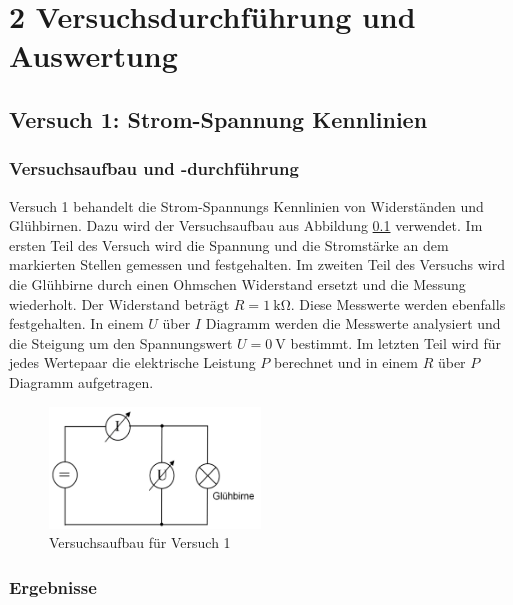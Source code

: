 \chapter*{2 Versuchsdurchführung und Auswertung}
\setcounter{chapter}{2}
\setcounter{section}{0}
\setcounter{subsection}{0}

\section{Versuch 1: Strom-Spannung Kennlinien}

    \subsection{Versuchsaufbau und -durchführung}

        Versuch 1 behandelt die Strom-Spannungs Kennlinien von Widerständen und Glühbirnen. Dazu wird der Versuchsaufbau aus Abbildung \ref{fig:versuch1} verwendet. Im ersten Teil des Versuch wird die Spannung und die Stromstärke an dem markierten Stellen gemessen und festgehalten. Im zweiten Teil des Versuchs wird die Glühbirne durch einen Ohmschen Widerstand ersetzt und die Messung wiederholt. Der Widerstand beträgt $R = 1\ \mathrm{k\Omega}$. Diese Messwerte werden ebenfalls festgehalten. In einem $U$ über $I$ Diagramm werden die Messwerte analysiert und die Steigung um den Spannungswert $U = 0\ \mathrm{V}$ bestimmt.
        Im letzten Teil wird für jedes Wertepaar die elektrische Leistung $P$ berechnet und in einem $R$ über $P$ Diagramm aufgetragen.

        \begin{figure}[H]
            \centering
            \includegraphics[width=0.5\textwidth]{bilder/Physik_01.png}
            \caption{Versuchsaufbau für Versuch 1}
            \label{fig:versuch1}
        \end{figure}

    \subsection{Ergebnisse}

